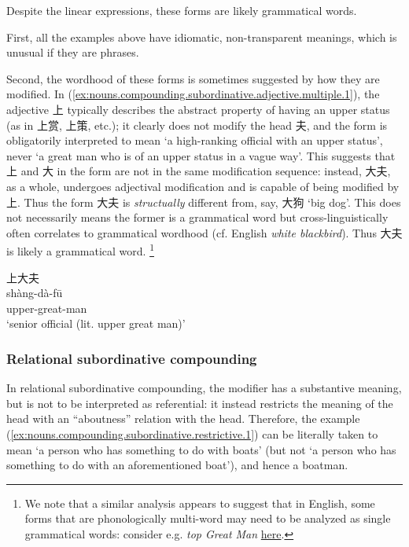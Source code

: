 \documentclass[UTF8, a4paper, oneside, scheme=plain, 12pt]{ctexrep}
\newcommand{\form}[1]{\emph{#1}}
\newcommand{\translate}[1]{`#1'}
\begin{document}
Despite the linear expressions, these forms are likely grammatical words.

First, all the examples above have idiomatic, non-transparent meanings, 
which is unusual if they are phrases.

Second, the wordhood of these forms is sometimes suggested by how they are modified.
In (\ref{ex:nouns.compounding.subordinative.adjective.multiple.1}),
the adjective 上 typically describes the abstract property of having an upper status
(as in 上赏, 上策, etc.);
it clearly does not modify the head 夫, and the form is obligatorily interpreted to mean
\translate{a high-ranking official with an upper status},
never \translate{a great man who is of an upper status in a vague way}.
This suggests that 上 and 大 in the form are not in the same modification sequence:
instead, 大夫, as a whole, undergoes adjectival modification and is capable of being modified by 上.
Thus the form 大夫 is \emph{structually} different from, say, 大狗 \translate{big dog}.
This does not necessarily means the former is a grammatical word
but cross-linguistically often correlates to grammatical wordhood (cf. English \form{white blackbird}).
Thus 大夫 is likely a grammatical word.%
\footnote{
    We note that a similar analysis appears to suggest that in English,
    some forms that are phonologically multi-word may need to be analyzed as single grammatical words:
    consider e.g. \form{top Great Man} \href{https://www.jstor.org/stable/29757772}{here}.
}

\begin{exe}
    \ex\label{ex:nouns.compounding.subordinative.adjective.multiple.1}
    \glll 上大夫 \\
    shàng-dà-fū \\
    upper-great-man \\
    \glt\translate{senior official (lit. upper great man)}
\end{exe}


\subsubsection{Relational subordinative compounding}


In relational subordinative compounding, the modifier has a substantive meaning,
but is not to be interpreted as referential:
it instead restricts the meaning of the head with an ``aboutness'' relation with the head.
Therefore, the example (\ref{ex:nouns.compounding.subordinative.restrictive.1}) can be literally taken to mean 
\translate{a person who has something to do with boats} (but not \translate{a person who has something to do with an aforementioned boat}),
and hence a boatman.
\end{document}
